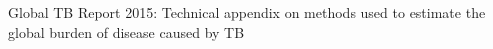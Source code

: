 Global TB Report 2015: Technical appendix on methods used to estimate the global burden of disease caused by TB